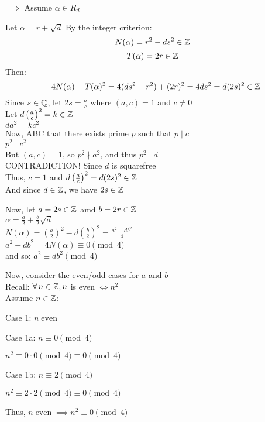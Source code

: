 \documentclass[letterpaper,12pt,fleqn]{article}
\newcommand{\sd}{\sqrt{d}}
\renewcommand{\a}{\alpha}
\DeclareMathOperator{\even}{even}
\begin{document}
\begin{theproof}
  \listbreak
  \begin{description}
  \item $\implies$ Assume $\a\in R_d$

    Let $\a=r+\sd$
    \newpage
    By the integer criterion:
    \[N(\a)=r^2-ds^2\in\Z\]
    \[T(\a)=2r\in\Z\]
    Then:
    \[-4N(\a)+T(\a)^2=4(ds^2-r^2)+(2r)^2=4ds^2=d(2s)^2\in\Z\]
    Since $s\in\mathbb{Q}$, let $2s=\frac{a}{c}$ where $(a,c)=1$ and $c\ne0$ \\
    Let $d\left(\frac{a}{c}\right)^2=k\in\mathbb{Z}$ \\
    $da^2=kc^2$ \\
    Now, ABC that there exists prime $p$ such that $p\mid c$ \\
    $p^2\mid c^2$ \\
    But $(a,c)=1$, so $p^2\nmid a^2$, and thus $p^2\mid d$ \\
    CONTRADICTION! Since $d$ is squarefree \\
    Thus, $c=1$ and $d\left(\frac{a}{c}\right)^2=d(2s)^2\in\mathbb{Z}$ \\
    And since $d\in\mathbb{Z}$, we have $2s\in\mathbb{Z}$

    Now, let $a=2s\in\mathbb{Z}$ amd $b=2r\in\mathbb{Z}$ \\
    $\a=\frac{a}{2}+\frac{b}{2}\sd$ \\
    $N(\a)=\left(\frac{a}{2}\right)^2-d\left(\frac{b}{2}\right)^2=
    \frac{a^2-db^2}{4}$ \\
    $a^2-db^2=4N(\a)\equiv0\pmod4$ \\
    and so: $a^2\equiv db^2\pmod4$

    Now, consider the even/odd cases for $a$ and $b$ \\
    Recall: $\forall\,n\in\mathbb{Z},n$ is even $\iff n^2$ \\
    Assume $n\in\mathbb{Z}$:
    \begin{description}
    \item Case 1: $n \even$
      \begin{description}
      \item Case 1a: $n\equiv0\pmod4$

        $n^2\equiv0\cdot0\pmod4\equiv0\pmod4$

      \item Case 1b: $n\equiv2\pmod4$

        $n^2\equiv2\cdot2\pmod4\equiv0\pmod4$
      \end{description}
      Thus, $n \even\implies n^2\equiv0\pmod4 $
      

\end{description}
\end{description}
\end{theproof}
\end{document}
